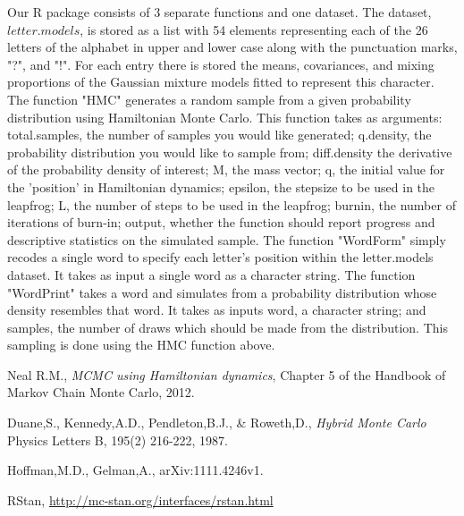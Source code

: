 \documentclass[11pt]{article}
\begin{document}
\noindent Our R package consists of 3 separate functions and one dataset.
The dataset, $letter.models$, is stored as a list with 54 elements representing each of the 26 letters of the alphabet in upper and lower case along with the punctuation marks, "?", and "!". For each entry there is stored the means, covariances, and mixing proportions of the Gaussian mixture models fitted to represent this character.
The function "HMC" generates a random sample from a given probability distribution using Hamiltonian Monte Carlo. This function takes as arguments: total.samples, the number of samples you would like generated; q.density, the probability distribution you would like to sample from; diff.density the derivative of the probability density of interest; M, the mass vector; q, the initial value for the 'position' in Hamiltonian dynamics; epsilon, the stepsize to be used in the leapfrog; L, the number of steps to be used in the leapfrog; burnin, the number of iterations of burn-in; output, whether the function should report progress and descriptive statistics on the simulated sample.
The function "WordForm" simply recodes a single word to specify each letter's position within the letter.models dataset. It takes as input a single word as a character string.
The function "WordPrint" takes a word and simulates from a probability distribution whose density resembles that word. It takes as inputs word, a character string; and samples, the number of draws which should be made from the distribution. This sampling is done using the HMC function above.

\begin{thebibliography}{9}

  Neal R.M.,
  \emph{MCMC using Hamiltonian dynamics},
  Chapter 5 of the Handbook of Markov Chain Monte Carlo,
  2012.
  
  Duane,S., Kennedy,A.D., Pendleton,B.J., \& Roweth,D.,
  \emph{Hybrid Monte Carlo }
  Physics Letters B, 195(2) 216-222, 1987.

  Hoffman,M.D., Gelman,A.,
  arXiv:1111.4246v1.
  
  RStan, \url{http://mc-stan.org/interfaces/rstan.html}

\end{thebibliography}
\end{document}
